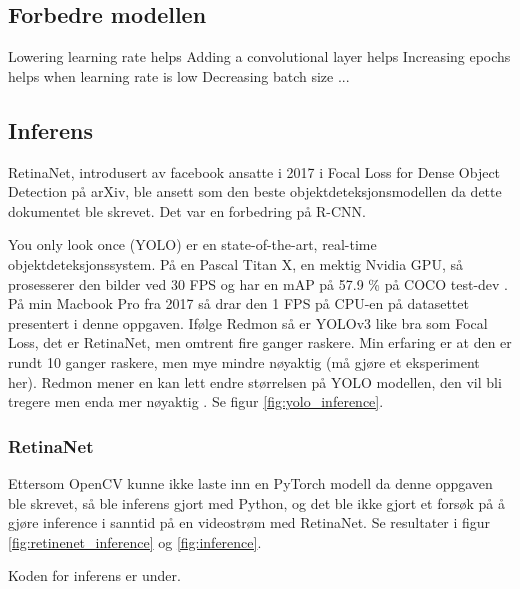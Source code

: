 \subsection{Forbedre modellen}

Lowering learning rate helps
Adding a convolutional layer helps
Increasing epochs helps when learning rate is low
Decreasing batch size ...

\subsection{Inferens}

RetinaNet, introdusert av facebook ansatte i 2017 i Focal Loss for Dense Object Detection på arXiv, ble ansett som den beste objektdeteksjonsmodellen da dette dokumentet ble skrevet. Det var en forbedring på R-CNN. \cite{Lin m.fl. 2017}

You only look once (YOLO) er en state-of-the-art, real-time objektdeteksjonssystem. På en Pascal Titan X, en mektig Nvidia GPU, så prosesserer den bilder ved 30 FPS og har en mAP på 57.9 \% på COCO test-dev \cite{Redmon m.fl. 2020}. På min Macbook Pro fra 2017 så drar den 1 FPS på CPU-en på datasettet presentert i denne oppgaven. Ifølge Redmon så er YOLOv3 like bra som Focal Loss, det er RetinaNet, men omtrent fire ganger raskere. Min erfaring er at den er rundt 10 ganger raskere, men mye mindre nøyaktig (må gjøre et eksperiment her). Redmon mener en kan lett endre størrelsen på YOLO modellen, den vil bli tregere men enda mer nøyaktig \cite{Redmon 2020}. Se figur \ref{fig:yolo_inference}.

\subsubsection{RetinaNet}

Ettersom OpenCV kunne ikke laste inn en PyTorch modell da denne oppgaven ble skrevet, så ble inferens gjort med Python, og det ble ikke gjort et forsøk på å gjøre inference i sanntid på en videostrøm med RetinaNet. Se resultater i figur \ref{fig:retinenet_inference} og \ref{fig:inference}.

Koden for inferens er under.


